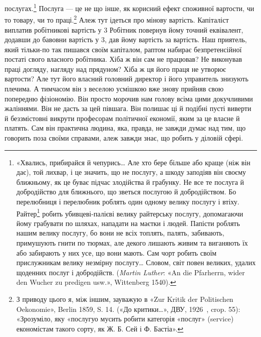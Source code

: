 послугах.\footnote{
«Хвались, прибирайся й чепурись\dots{} Але хто бере
більше або краще (ніж він дає), той лихвар, і це значить, що не послугу,
а шкоду заподіяв він своєму ближньому, як це буває підчас злодійства й грабунку.
Не все те послуга й добродійство для ближнього, що зветься послугою й
добродійством. Бо перелюбниця і перелюбник роблять один одному велику
послугу і втіху. Райтер\footnote*{
-військовий, кінник. \emph{Ред.}
}
робить убивцеві-палієві велику райтерську
послугу, допомагаючи йому грабувати по шляхах, нападати на маєтки і
людей. Папісти роблять нашим велику послугу, бо вони не всіх топлять,
палять, забивають, примушують гнити по тюрмах, але декого лишають
живим та виганяють їх або забирають у них усе, що вони мають. Сам чорт
робить своїм прислужникам велику незмірну послугу\dots{} Словом, світ
повен великих, удалих щоденних послуг і добродійств. (\emph{Martin Luther}:
«An die Pfarherrn, wider den Wucher zu predigen usw.», Wittenberg 1540).
} Послуга — це не що інше, як корисний ефект споживної
вартости, чи то товару, чи то праці.\footnote{
З приводу цього я, між іншим, зауважую в «Zur Kritik der Politischen
Oekonomie», Berlin 1859, S. 14. («До критики\dots{}», ДВУ, 1926~,
crop. 55): «Зрозуміло, яку «послугуо мусить робити категорія «послуг»
(service) економістам такого сорту, як Ж. Б. Сей і Ф. Бастіа».
} Алеж тут ідеться
про мінову вартість. Капіталіст виплатив робітникові вартість
у 3 Робітник повернув йому точний еквівалент, додавши
до бавовни вартість у 3, дав йому вартість за вартість.
Наш приятель, який тільки-по так пишався своїм капіталом,
раптом набирає безпретенсійної постаті свого власного робітника.
Хіба ж він сам не працював? Не виконував праці догляду, нагляду
над прядуном? Хіба ж ця його праця не утворює вартости?
Але тут його власний головний директор і його управитель знизують
плечима. А тимчасом він з веселою усмішкою вже знову прийняв
свою попередню фізіономію. Він просто морочив нам голову
всіма цими докучливими жаліннями. Він не дасть за цей півшага.
Він полишає ці й подібні пусті виверти й беззмістовні викрути
професорам політичної економії, яким за це власне й платять.
Сам він практична людина, яка, правда, не завжди думає над тим,
що говорить поза своїми справами, алеж завжди знає, що робить
у діловій сфері.

